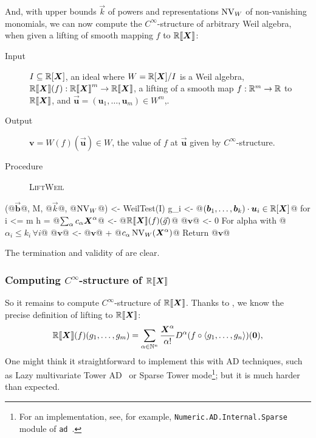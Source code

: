 \documentclass[%
  sigconf,authorversion,screen]{acmart}
\begin{document}
And, with upper bounds $\vec k$ of powers and representations $\operatorname{NV}_W$ of non-vanishing monomials, we can now compute the $C^\infty$-structure of arbitrary Weil algebra, when given a lifting of smooth mapping $f$ to $\mathord{\mathbb{R}\llbracket\boldsymbol{X}\rrbracket}$:

\begin{algorithm}\label{alg:smooth-weil}
  \hfill\vspace{-.25em}
  \begin{description}
    \item[Input]
      $I \subseteq \mathbb{R}[\boldsymbol{X}]$, an ideal where $W = \mathbb{R}[\boldsymbol{X}]/I$ is a Weil algebra,
      $\mathbb{R} \llbracket\boldsymbol{X}\rrbracket(f): \mathord{\mathbb{R}\llbracket\boldsymbol{X}\rrbracket}^m \to \mathord{\mathbb{R}\llbracket\boldsymbol{X}\rrbracket}$, a lifting of a smooth map $f: \mathbb{R}^m \to \mathbb{R}$ to $\mathord{\mathbb{R}\llbracket\boldsymbol{X}\rrbracket}$, and $\vec{\boldsymbol{u}} = (\boldsymbol{u}_1, \dots, \boldsymbol{u}_m) \in W^m$,.
    \item[Output] $\boldsymbol{v} = W(f)(\vec{\boldsymbol u}) \in W$, the value of $f$ at $\vec{\boldsymbol{u}}$ given by $C^\infty$-structure.
    \item[Procedure] \textup{\textsc{LiftWeil}}
  \end{description}
\begin{alg}
(@$\vec{\boldsymbol{b}}$@, M, @$\vec{k}$@, @$\operatorname{NV}_W$@) <- WeilTest(I)
g_i <- @$(\boldsymbol{b}_1, \dots, \boldsymbol{b}_k) \cdot \boldsymbol{u}_i \in \mathbb{R}[\boldsymbol{X}]$@ for i <= m
h = @$\sum_\alpha c_\alpha \boldsymbol{X}^\alpha$@ <- @$\mathord{\mathbb{R}\llbracket\boldsymbol{X}\rrbracket}(f)(\vec{g})$@
@$\boldsymbol v$@ <- 0
For alpha with @$\alpha_i \leq k_i\, \forall i$@
  @$\boldsymbol{v}$@ <- @$\boldsymbol v$@ + @$c_\alpha \operatorname{NV}_W(\boldsymbol{X}^\alpha)$@
Return @$\boldsymbol{v}$@
\end{alg}
\end{algorithm}

The termination and validity of  are clear.

\subsubsection{Computing $C^\infty$-structure of $\mathord{\mathbb{R}\llbracket\boldsymbol{X}\rrbracket}$}\label{sec:power-series-lifting}
So it remains to compute $C^\infty$-structure of $\mathord{\mathbb{R}\llbracket\boldsymbol{X}\rrbracket}$.
Thanks to , we know the precise definition of lifting to $\mathord{\mathbb{R}\llbracket\boldsymbol{X}\rrbracket}$:
\[
  \mathord{\mathbb{R}\llbracket\boldsymbol{X}\rrbracket}(f)(g_1, \dots, g_m) = \sum_{\alpha \in \mathbb{N}^n} \frac{\boldsymbol{X}^\alpha}{\alpha!} D^\alpha(f \circ \braket{g_1, \dots, g_n})(\boldsymbol{0}),
\]
One might think it straightforward to implement this with AD techniques, such as Lazy multivariate Tower AD~\cite{Pearlmutter:2007aa} or Sparse Tower mode\footnote{For an implementation, see, for example, \texttt{Numeric.AD.Internal.Sparse} module of \texttt{ad}~\cite{Kmett:2010aa}.}; but it is much harder than expected.
\end{document}
